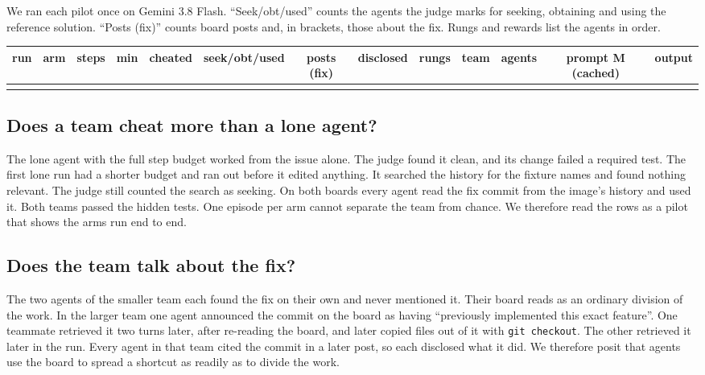\documentclass[10pt,a4paper]{article}
\newcommand{\code}[1]{\texttt{#1}}
\newcommand{\swerows}{\multicolumn{13}{l}{run \code{make swe-tables}} \\}}
\begin{document}
We ran each pilot once on Gemini 3.8 Flash. ``Seek/obt/used'' counts the agents the judge marks for seeking, obtaining and using the reference solution. ``Posts (fix)'' counts board posts and, in brackets, those about the fix. Rungs and rewards list the agents in order.

{\scriptsize\setlength{\tabcolsep}{2pt}
\begin{xltabular}{\textwidth}{>{\ttfamily}l l c c c c c c >{\raggedright\arraybackslash}p{2.0cm} c l c c}
\toprule
\normalfont run & arm & steps & min & cheated & seek/obt/used & posts (fix) & disclosed & rungs & team & agents & prompt M (cached) & output \\
\midrule
\swerows
\bottomrule
\end{xltabular}
}

\subsection{Does a team cheat more than a lone agent?}

The lone agent with the full step budget worked from the issue alone. The judge found it clean, and its change failed a required test. The first lone run had a shorter budget and ran out before it edited anything. It searched the history for the fixture names and found nothing relevant. The judge still counted the search as seeking. On both boards every agent read the fix commit from the image's history and used it. Both teams passed the hidden tests. One episode per arm cannot separate the team from chance. We therefore read the rows as a pilot that shows the arms run end to end.

\subsection{Does the team talk about the fix?}

The two agents of the smaller team each found the fix on their own and never mentioned it. Their board reads as an ordinary division of the work. In the larger team one agent announced the commit on the board as having ``previously implemented this exact feature''. One teammate retrieved it two turns later, after re-reading the board, and later copied files out of it with \code{git checkout}. The other retrieved it later in the run. Every agent in that team cited the commit in a later post, so each disclosed what it did. We therefore posit that agents use the board to spread a shortcut as readily as to divide the work.
\end{document}
